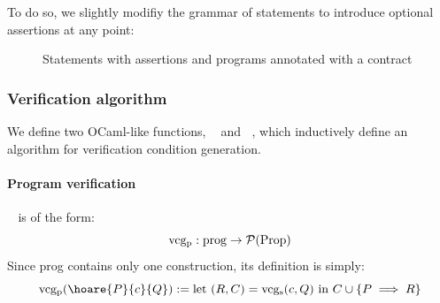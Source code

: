 \documentclass[toc, titlepaged]{../cs-classes/cs-classes}
\DeclareMathOperator{\vcgp}{vcg_p}
\DeclareMathOperator{\vcgs}{vcg_s}
\begin{document}
To do so, we slightly modifiy the grammar of statements to introduce optional assertions at any point:
\begin{figure}[H]
    \centering
    \begin{grammar}
        \gskip{}
    \end{grammar}
    \caption{Statements with assertions and programs annotated with a contract}
\end{figure}

\subsubsection{Verification algorithm}
We define two OCaml-like functions, $\vcgp$ and $\vcgs$, which inductively define an algorithm for verification condition generation.

\paragraph*{Program verification} 
$\vcgp$ is of the form:
\begin{equation*}
    \vcgp : \textnormal{prog} \rightarrow \mathcal{P}(\textnormal{Prop})
\end{equation*}
Since prog contains only one construction, its definition is simply:
\begin{equation*}
    \vcgp(\hoare{P}{c}{Q}) := \textnormal{let } (R, C) = \vcgs(c, Q) \textnormal{ in } C\cup\{P\implies R\}
\end{equation*}
\end{document}
